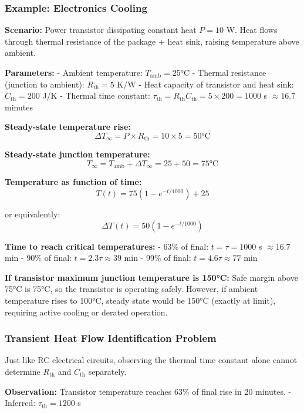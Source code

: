 \documentclass[
]{article}
\begin{document}
\subsubsection{Example: Electronics
Cooling}\label{example-electronics-cooling}

\textbf{Scenario:} Power transistor dissipating constant heat \(P = 10\)
W. Heat flows through thermal resistance of the package + heat sink,
raising temperature above ambient.

\textbf{Parameters:} - Ambient temperature: \(T_{\text{amb}} = 25°\)C -
Thermal resistance (junction to ambient): \(R_{\text{th}} = 5\) K/W -
Heat capacity of transistor and heat sink: \(C_{\text{th}} = 200\) J/K -
Thermal time constant:
\(\tau_{\text{th}} = R_{\text{th}} C_{\text{th}} = 5 \times 200 = 1000\)
s \(\approx 16.7\) minutes

\textbf{Steady-state temperature rise:}
\[\Delta T_{\infty} = P \times R_{\text{th}} = 10 \times 5 = 50\text{°C}\]

\textbf{Steady-state junction temperature:}
\[T_{\infty} = T_{\text{amb}} + \Delta T_{\infty} = 25 + 50 = 75\text{°C}\]

\textbf{Temperature as function of time:}
\[T(t) = 75(1 - e^{-t/1000}) + 25\]

or equivalently: \[\Delta T(t) = 50(1 - e^{-t/1000})\]

\textbf{Time to reach critical temperatures:} - 63\% of final:
\(t = \tau = 1000\) s \(\approx 16.7\) min - 90\% of final:
\(t = 2.3\tau \approx 39\) min - 99\% of final:
\(t = 4.6\tau \approx 77\) min

\textbf{If transistor maximum junction temperature is 150°C:} Safe
margin above 75°C is 75°C, so the transistor is operating safely.
However, if ambient temperature rises to 100°C, steady state would be
150°C (exactly at limit), requiring active cooling or derated operation.

\subsubsection{Transient Heat Flow Identification
Problem}\label{transient-heat-flow-identification-problem}

Just like RC electrical circuits, observing the thermal time constant
alone cannot determine \(R_{\text{th}}\) and \(C_{\text{th}}\)
separately.

\textbf{Observation:} Transistor temperature reaches 63\% of final rise
in 20 minutes. - Inferred: \(\tau_{\text{th}} = 1200\) s
\end{document}
